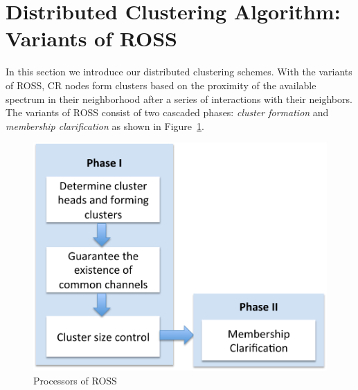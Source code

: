\documentclass[times]{ettauth}
\newcommand{\ie}{i.e., }
\theoremstyle{mytheoremstyle}
\theoremstyle{mytheoremstyle}
\theoremstyle{mytheoremstyle}
\newcommand{\bigO}{\ensuremath{\mathcal{O}}}%
\begin{document}


\section{Distributed Clustering Algorithm: Variants of ROSS}
\label{ross}

In this section we introduce our distributed clustering schemes.
With the variants of ROSS, CR nodes form clusters based on the proximity of the available spectrum in their neighborhood after a series of interactions with their neighbors.
The variants of ROSS consist of two cascaded phases: \textit{cluster formation} and \textit{membership clarification} as shown in Figure~\ref{flowChartROSS}.
\begin{figure}[ht!]
  \centering
\includegraphics[width=0.8\linewidth]{flow_chart.pdf}
	\caption{Processors of ROSS}
	\label{flowChartROSS}
\end{figure}
\end{document}
